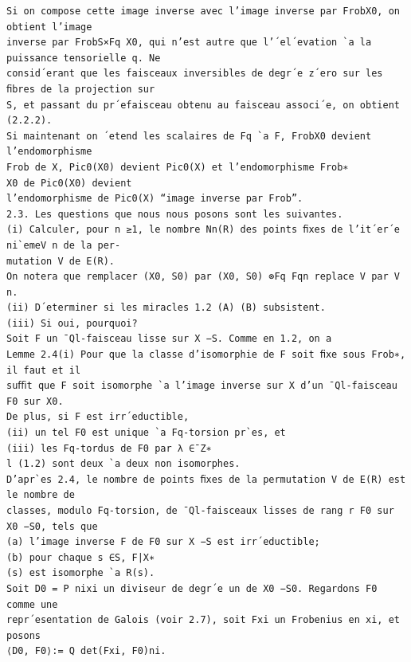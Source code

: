 \documentclass[11pt]{article}
\begin{document}
\begin{Verbatim}[breaklines=true,fontsize=\small]
Si on compose cette image inverse avec l’image inverse par FrobX0, on obtient l’image
inverse par FrobS×Fq X0, qui n’est autre que l’´el´evation `a la puissance tensorielle q. Ne
consid´erant que les faisceaux inversibles de degr´e z´ero sur les ﬁbres de la projection sur
S, et passant du pr´efaisceau obtenu au faisceau associ´e, on obtient (2.2.2).
Si maintenant on ´etend les scalaires de Fq `a F, FrobX0 devient l’endomorphisme
Frob de X, Pic0(X0) devient Pic0(X) et l’endomorphisme Frob∗
X0 de Pic0(X0) devient
l’endomorphisme de Pic0(X) “image inverse par Frob”.
2.3. Les questions que nous nous posons sont les suivantes.
(i) Calculer, pour n ≥1, le nombre Nn(R) des points ﬁxes de l’it´er´e ni`emeV n de la per-
mutation V de E(R).
On notera que remplacer (X0, S0) par (X0, S0) ⊗Fq Fqn replace V par V n.
(ii) D´eterminer si les miracles 1.2 (A) (B) subsistent.
(iii) Si oui, pourquoi?
Soit F un ¯Ql-faisceau lisse sur X −S. Comme en 1.2, on a
Lemme 2.4(i) Pour que la classe d’isomorphie de F soit ﬁxe sous Frob∗, il faut et il
suﬃt que F soit isomorphe `a l’image inverse sur X d’un ¯Ql-faisceau F0 sur X0.
De plus, si F est irr´eductible,
(ii) un tel F0 est unique `a Fq-torsion pr`es, et
(iii) les Fq-tordus de F0 par λ ∈¯Z∗
l (1.2) sont deux `a deux non isomorphes.
D’apr`es 2.4, le nombre de points ﬁxes de la permutation V de E(R) est le nombre de
classes, modulo Fq-torsion, de ¯Ql-faisceaux lisses de rang r F0 sur X0 −S0, tels que
(a) l’image inverse F de F0 sur X −S est irr´eductible;
(b) pour chaque s ∈S, F|X∗
(s) est isomorphe `a R(s).
Soit D0 = P nixi un diviseur de degr´e un de X0 −S0. Regardons F0 comme une
repr´esentation de Galois (voir 2.7), soit Fxi un Frobenius en xi, et posons
⟨D0, F0⟩:= Q det(Fxi, F0)ni.


\end{Verbatim}
\end{document}
